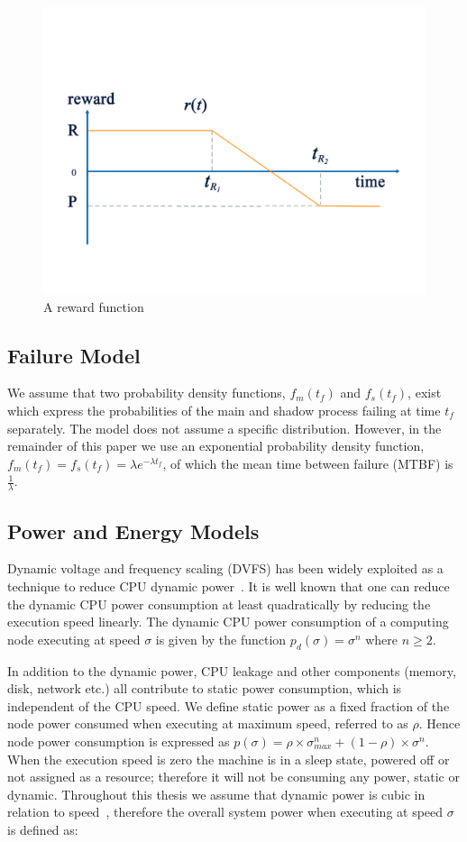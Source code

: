 \begin{figure}[t!]	
	\begin{center}
		\includegraphics[width=0.6\columnwidth]{figures/reward.pdf}
	\end{center}
	\caption{A reward function}
	\label{fig:reward}
\end{figure}


\subsection{Failure Model}

We assume that two probability density functions, $f_m(t_f)$ and
$f_s(t_f)$, exist which express the probabilities of the main and shadow
process failing at time $t_f$ separately. The model does not assume a
specific distribution. However, in the remainder of this paper we use
an exponential probability density function, $f_m(t_f)=f_s(t_f)=\lambda
e^{-\lambda t_f}$, of which the mean time between failure (MTBF) is $\frac{1}{\lambda}$.

\subsection{Power and Energy Models}
Dynamic voltage and frequency scaling
(DVFS) has
been widely exploited as a technique to reduce CPU dynamic power~\cite{flautner_2002_APS,pillai_2001_sosp}. It
is well known that one can reduce the dynamic CPU power consumption at
least quadratically by reducing the execution speed linearly. The
dynamic CPU power consumption of a computing node executing at speed
$\sigma$ is given by the function $p_d(\sigma)=\sigma^n$ where $n \ge
2$.

In addition to the dynamic power, CPU leakage and other components
(memory, disk, network etc.) all contribute to static power
consumption, which is independent of the CPU speed. We
define static power as a fixed fraction of the node power consumed
when executing at maximum speed, referred to as $\rho$. Hence node
power consumption is expressed as
$p(\sigma)=\rho \times \sigma_{max}^n + (1-\rho)\times \sigma^n$. When the execution speed is zero
the machine is in a sleep state, powered off or not assigned as a
resource; therefore it will not be consuming any power, static or
dynamic.  Throughout this thesis we assume that dynamic power is cubic
in relation to
speed~\cite{rusu_2003_ecs,zhai_2004_dac}, therefore the
overall system power when executing at speed $\sigma$ is defined as:

